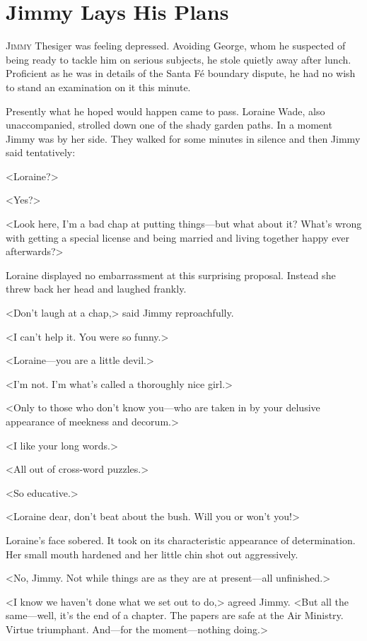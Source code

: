 \chapter{Jimmy Lays His Plans}

\lettrine{J}{immy} Thesiger was feeling depressed. Avoiding George, whom he suspected of being ready to tackle him on serious subjects, he stole quietly away after lunch. Proficient as he was in details of the Santa Fé boundary dispute, he had no wish to stand an examination on it this minute.

Presently what he hoped would happen came to pass. Loraine Wade, also unaccompanied, strolled down one of the shady garden paths. In a moment Jimmy was by her side. They walked for some minutes in silence and then Jimmy said tentatively:

<Loraine?>

<Yes?>

<Look here, I'm a bad chap at putting things—but what about it? What's wrong with getting a special license and being married and living together happy ever afterwards?>

Loraine displayed no embarrassment at this surprising proposal. Instead she threw back her head and laughed frankly.

<Don't laugh at a chap,> said Jimmy reproachfully.

<I can't help it. You were so funny.>

<Loraine—you are a little devil.>

<I'm not. I'm what's called a thoroughly nice girl.>

<Only to those who don't know you—who are taken in by your delusive appearance of meekness and decorum.>

<I like your long words.>

<All out of cross-word puzzles.>

<So educative.>

<Loraine dear, don't beat about the bush. Will you or won't you!>

Loraine's face sobered. It took on its characteristic appearance of determination. Her small mouth hardened and her little chin shot out aggressively.

<No, Jimmy. Not while things are as they are at present—all unfinished.>

<I know we haven't done what we set out to do,> agreed Jimmy. <But all the same—well, it's the end of a chapter. The papers are safe at the Air Ministry. Virtue triumphant. And—for the moment—nothing doing.>

